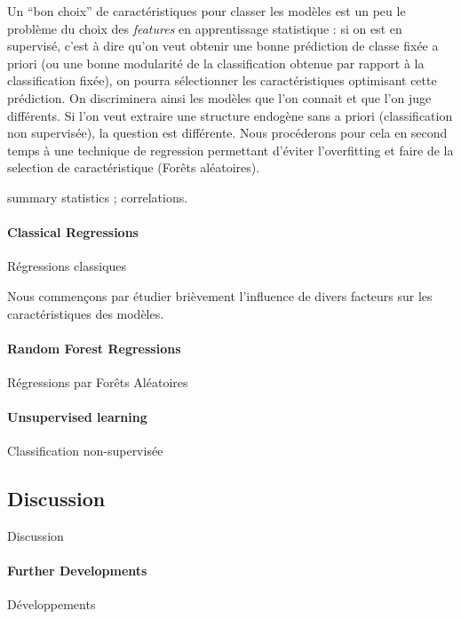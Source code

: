 Un ``bon choix'' de caractéristiques pour classer les modèles est un peu le problème du choix des \emph{features} en apprentissage statistique : si on est en supervisé, c'est à dire qu'on veut obtenir une bonne prédiction de classe fixée a priori (ou une bonne modularité de la classification obtenue par rapport à la classification fixée), on pourra sélectionner les caractéristiques optimisant cette prédiction. On discriminera ainsi les modèles que l'on connait et que l'on juge différents. Si l'on veut extraire une structure endogène sans a priori (classification non supervisée), la question est différente. Nous procéderons pour cela en second temps à une technique de regression permettant d'éviter l'overfitting et faire de la selection de caractéristique (Forêts aléatoires).


summary statistics ; correlations.


\paragraph{Classical Regressions}{Régressions classiques}

Nous commençons par étudier brièvement l'influence de divers facteurs sur les caractéristiques des modèles.



\paragraph{Random Forest Regressions}{Régressions par Forêts Aléatoires}




\paragraph{Unsupervised learning}{Classification non-supervisée}





\subsection{Discussion}{Discussion}


\paragraph{Further Developments}{Développements}


